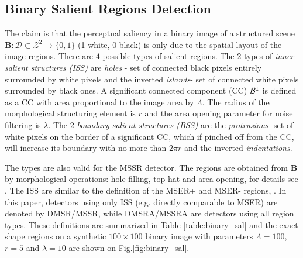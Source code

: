 \documentclass{article}
\def\B{{\mathbf B}}
\def\mcD{{\mathcal{D}}}
\begin{document}
\subsection{Binary Salient Regions Detection}
\label{ssec:binary}
The claim is that the perceptual saliency in a binary image of a structured scene 
 $\B: \mcD \subset \mathcal{Z}^2 \rightarrow \{0,1\}$ (1-white, 0-black)
is only due to the spatial layout of the image regions. 
There are  $4$ possible types of salient regions. The $2$ types of {\em inner salient structures (ISS)} are {\em holes} - set of connected black pixels entirely surrounded by white pixels and the inverted {\em islands}- set of connected white pixels surrounded by black ones. A significant connected component (CC) ${\cal B}^1$ is defined as a CC with area proportional to the image area by $\Lambda$. The radius of the morphological structuring element is $r$ and  the area opening parameter for  noise filtering is $\lambda$. The $2$ {\em boundary salient structures (BSS)} are the {\em protrusions}- set of white pixels on the border of a significant CC, which if pinched off from the CC, will increase its boundary with no more than $2\pi r$ and the inverted {\em indentations}. 


The types are also valid for the MSSR detector. The regions are obtained from $\B$ by morphological operations: hole filling, top hat and area opening, for details see \cite{RangMSSR06, RangHumpb06}. The ISS are similar to the definition of the MSER+ and MSER- regions, \cite{Matas2002BMVC}. In this paper, detectors using only ISS (e.g. directly comparable to MSER) are denoted by DMSR/MSSR, while DMSRA/MSSRA are detectors using all region types. These definitions are summarized in Table \ref{table:binary_sal} and the exact shape regions on a synthetic $100 \times 100$ binary image with parameters $\Lambda=100$, $r=5$ and $\lambda = 10$  are shown on Fig.\ref{fig:binary_sal}.
\end{document}
